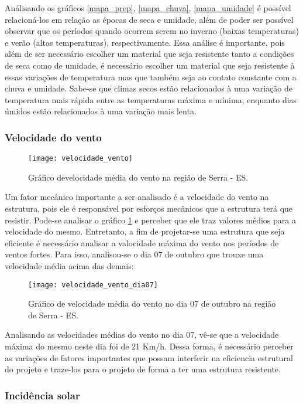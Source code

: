 Análisando os gráficos \ref{mapa_prep}, \ref{mapa_chuva}, \ref{mapa_umidade} é possível relacioná-los em relação as épocas de seca e umidade, além de poder ser possível observar que os períodos quando ocorrem serem no inverno (baixas temperaturas) e verão (altas temperaturas), respectivamente. Essa análise é importante, pois além de ser necessário escolher um material que seja resistente tanto a condições de seca como de umidade, é necessário escolher um material que seja resistente à essas variações de temperatura mas que também seja ao contato constante com a chuva e umidade. Sabe-se que climas secos estão relacionados à uma variação de temperatura mais rápida entre as temperaturas máxima e mínima, enquanto dias úmidos estão relacionados à uma variação mais lenta.
 
\subsubsection{Velocidade do vento}

\begin{figure}[!h]
	\texttt{[image: velocidade\_vento]}
	\centering
	\caption{Gráfico develocidade média do vento na região de Serra - ES.}
	\label{vel_vento}
\end{figure}

Um fator mecânico importante a ser analisado é a velocidade do vento na estrutura, pois ele é responsável por esforços mecânicos que a estrutura terá que resistir. Pode-se analisar o gráfico \ref{vel_vento} e perceber que ele traz valores médios para a velocidade do mesmo. Entretanto, a fim de projetar-se uma estrutura que seja eficiente é necessário analisar a valocidade máxima do vento nos períodos de ventos fortes. Para isso, analisou-se o dia 07 de outubro que trouxe uma velocidade média acima das demais:

\begin{figure}[!h]
	\texttt{[image: velocidade\_vento\_dia07]}
	\centering
	\caption{Gráfico de velocidade média do vento no dia 07 de outubro na região de Serra - ES.}
\end{figure}

Analisando as velocidades médias do vento no dia 07, vê-se que a velocidade máxima do mesmo neste dia foi de 21 Km/h. Dessa forma, é necessário perceber as variações de fatores importantes que possam interferir na eficiencia estrutural do projeto e traze-los para o projeto de forma a ter uma estrutura resistente.


\subsubsection{Incidência solar}



